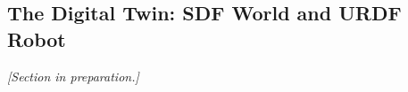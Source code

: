 \subsection{The Digital Twin: SDF World and URDF Robot}
\label{sec:phaseB_twin}

\emph{[Section in preparation.]}
